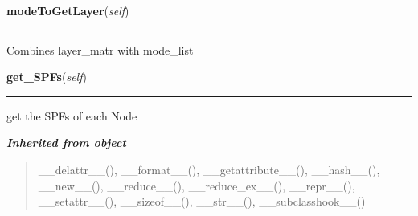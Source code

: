     \label{GUI:ModelTree:ModelTree:modeToGetLayer}

    \vspace{0.5ex}

\hspace{.8\funcindent}\begin{boxedminipage}{\funcwidth}

    \raggedright \textbf{modeToGetLayer}(\textit{self})

    \vspace{-1.5ex}

    \rule{\textwidth}{0.5\fboxrule}
\setlength{\parskip}{2ex}
    Combines layer\_matr with mode\_list

\setlength{\parskip}{1ex}
    \end{boxedminipage}

    \label{GUI:ModelTree:ModelTree:get_SPFs}

    \vspace{0.5ex}

\hspace{.8\funcindent}\begin{boxedminipage}{\funcwidth}

    \raggedright \textbf{get\_SPFs}(\textit{self})

    \vspace{-1.5ex}

    \rule{\textwidth}{0.5\fboxrule}
\setlength{\parskip}{2ex}
    get the SPFs of each Node

\setlength{\parskip}{1ex}
    \end{boxedminipage}


\large{\textbf{\textit{Inherited from object}}}

\begin{quote}
\_\_delattr\_\_(), \_\_format\_\_(), \_\_getattribute\_\_(), \_\_hash\_\_(), \_\_new\_\_(), \_\_reduce\_\_(), \_\_reduce\_ex\_\_(), \_\_repr\_\_(), \_\_setattr\_\_(), \_\_sizeof\_\_(), \_\_str\_\_(), \_\_subclasshook\_\_()
\end{quote}


